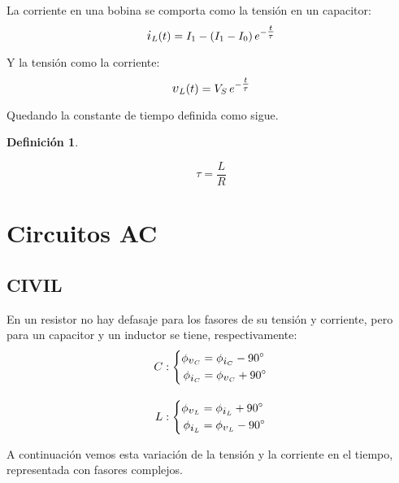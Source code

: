 \documentclass[a5paper,12pt,twoside]{book}
\newtheorem{defn}{{Definición}}[chapter]
\begin{document}
La corriente en una bobina se comporta como la tensión en un capacitor:
\begin{equation*}
    \current_L(t) = I_1 - \inParentheses{I_1 - I_0} e^{-\tfrac{t}{\tau}}
\end{equation*}

Y la tensión como la corriente:
\begin{equation*}
    \voltage_L(t) = V_S \, e^{-\tfrac{t}{\tau}}
\end{equation*}

Quedando la constante de tiempo definida como sigue.

\begin{mdframed}[style=MyFrame1]
    \begin{defn}
    \end{defn}
    \begin{equation*}
        \tau = \frac{L}{R}
    \end{equation*}
\end{mdframed}


\chapter{Circuitos AC}


\section{CIVIL}

En un resistor no hay defasaje para los fasores de su tensión y corriente, pero para un capacitor y un inductor se tiene, respectivamente:
\begin{gather*}
    C: \left\{
    \begin{aligned}
        \phi_{\voltage_C} &= \phi_{\current_C} - \ang{90}
        \\
        \phi_{\current_C} &= \phi_{\voltage_C} + \ang{90}
    \end{aligned}
    \right.
    \\[1em]
    L: \left\{
    \begin{aligned}
        \phi_{\voltage_L} &= \phi_{\current_L} + \ang{90}
        \\
        \phi_{\current_L} &= \phi_{\voltage_L} - \ang{90}
    \end{aligned}
    \right.
\end{gather*}

A continuación vemos esta variación de la tensión y la corriente en el tiempo, representada con fasores complejos.
\end{document}
